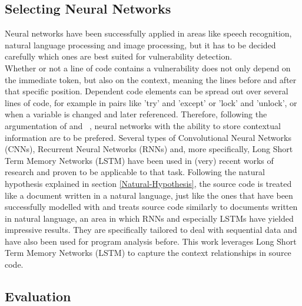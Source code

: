\documentclass[
	a4paper,
	pagesize,
	pdftex,
	12pt,
	twoside, %
	BCOR=5mm, %
	ngerman,
	fleqn,
	final,
	]{scrartcl}
\begin{document}
\subsection{Selecting Neural Networks}

Neural networks have been successfully applied in areas like speech recognition, natural language processing and image processing, but it has to be decided carefully which ones are best suited for vulnerability detection. \\
Whether or not a line of code contains a vulnerability does not only depend on the immediate token, but also on the context, meaning the lines before and after that specific position. Dependent code elements can be spread out over several lines of code, for example in pairs like 'try' and 'except' or 'lock' and 'unlock', or when a variable is changed and later referenced. Therefore, following the argumentation of \cite{Liu.2018} and ~\cite{Dam.2017}, neural networks with the ability to store contextual information are to be prefered. Several types of Convolutional Neural Networks (CNNs), Recurrent Neural Networks (RNNs) and, more specifically, Long Short Term Memory Networks (LSTM) have been used in (very) recent works of research and proven to be applicable to that task. Following the natural hypothesis explained in section \ref{Natural-Hypothesis}, the source code is treated like a document written in a natural language, just like the ones that have been successfully modelled with and treats source code similarly to documents written in natural language, an area in which RNNs and especially LSTMs have yielded impressive results. They are specifically tailored to deal with sequential data and have also been used for program analysis before. This work leverages Long Short Term Memory Networks (LSTM) to capture the context relationships in source code. 



\newpage
\subsection{Evaluation}
\end{document}
